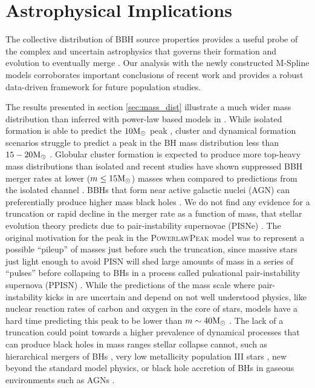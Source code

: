 \section{Astrophysical Implications}\label{sec:astrodiscussion}

The collective distribution of BBH source properties provides a useful probe of the complex and uncertain astrophysics that governs their 
formation and evolution to eventually merge \citep{Zevin_2017}. Our analysis with the newly constructed M-Spline models corroborates important 
conclusions of recent work and provides a robust data-driven framework for future population studies. 

The results presented in section \ref{sec:mass_dist} illustrate a much wider mass distribution than inferred with power-law based models in \citet{o3b_astro_dist}. 
While isolated formation is able to predict the $10{\rm M}_\odot$ peak , cluster and dynamical formation scenarios struggle to predict a peak in the BH mass distribution less than 
$15-20{\rm M}_\odot$ . Globular cluster formation is expected to produce more top-heavy mass distributions than isolated and recent studies have shown suppressed BBH merger rates 
at lower ($m\leq15{\rm M}_\odot$) masses when compared to predictions from the isolated channel . BBHs that form near active galactic nuclei (AGN) can preferentially produce higher 
mass black holes . We do not find any evidence for a truncation or rapid decline in the merger rate as a function of mass, that stellar evolution theory predicts 
due to pair-instability supernovae (PISNe) \citep{Heger_2002,PISN_Woosley,Heger_2003,Spera_2017}. The original motivation for the peak in the \textsc{PowerlawPeak} model \citep{Talbot_2018} was to represent a possible ``pileup'' of 
masses just before such the truncation, since massive stars just light enough to avoid PISN will shed large amounts of mass in a series of ``pulses'' before collapsing to BHs in a process called 
pulsational pair-instability supernova (PPISN) \citep{Woosley_2017,Woosley_2019,Farmer_2019}. While the predictions of the mass scale where pair-instability kicks in are uncertain and depend on not well understood physics, 
like nuclear reaction rates of carbon and oxygen in the core of stars, models have a hard time predicting this peak to be lower than $m\sim40{\rm M}_\odot$ \citep{Belczynski_2016,Marchant_2019,Renzo_2020,Farmer_2019,Farmer_2020}. The lack of a truncation could 
point towards a higher prevalence of dynamical processes that can produce black holes in mass ranges stellar collapse cannot, such as hierarchical mergers of BHs \citep{Fishbach_2017,Doctor_2020,Kimball_genealogy,kimball2020evidence,doctor2021black,Fishbach_2022}, 
very low metallicity population III stars \citep{Belczynski_2020,Farrell_2020}, new beyond the standard model physics\citep{Croon_newphysics,Sakstein_2020}, or black hole accretion of BHs in gaseous environments such as AGNs \citep{Secunda_2020,McKernan_2020,cruzosorio2021gw190521}. 

